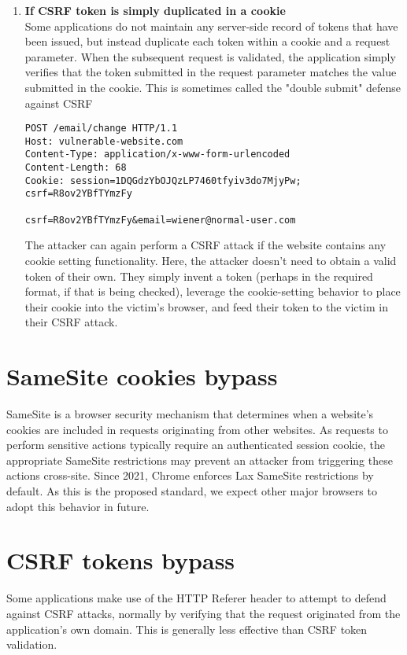 \documentclass{article}
\begin{document}
\begin{enumerate}
\item \textbf{If CSRF token is simply duplicated in a cookie}\\
Some applications do not maintain any server-side record of tokens that have been issued, but instead duplicate each token within a cookie and a request parameter. When the subsequent request is validated, the application simply verifies that the token submitted in the request parameter matches the value submitted in the cookie. This is sometimes called the "double submit" defense against CSRF
			\begin{lstlisting}[frame=single]
POST /email/change HTTP/1.1
Host: vulnerable-website.com
Content-Type: application/x-www-form-urlencoded
Content-Length: 68
Cookie: session=1DQGdzYbOJQzLP7460tfyiv3do7MjyPw; csrf=R8ov2YBfTYmzFy

csrf=R8ov2YBfTYmzFy&email=wiener@normal-user.com
            \end{lstlisting}
The attacker can again perform a CSRF attack if the website contains any cookie setting functionality. Here, the attacker doesn't need to obtain a valid token of their own. They simply invent a token (perhaps in the required format, if that is being checked), leverage the cookie-setting behavior to place their cookie into the victim's browser, and feed their token to the victim in their CSRF attack. 


\end{enumerate}


\section*{SameSite cookies bypass}
SameSite is a browser security mechanism that determines when a website's cookies are included in requests originating from other websites. As requests to perform sensitive actions typically require an authenticated session cookie, the appropriate SameSite restrictions may prevent an attacker from triggering these actions cross-site. Since 2021, Chrome enforces Lax SameSite restrictions by default. As this is the proposed standard, we expect other major browsers to adopt this behavior in future. 

\section*{CSRF tokens bypass}
Some applications make use of the HTTP Referer header to attempt to defend against CSRF attacks, normally by verifying that the request originated from the application's own domain. This is generally less effective than CSRF token validation. 
\end{document}
